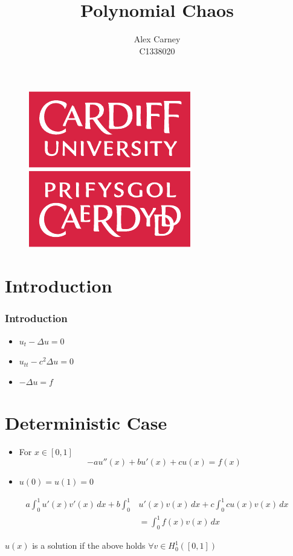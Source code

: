 \documentclass{beamer}
\date{}
\title{Polynomial Chaos}
\author{Alex Carney \\ C1338020}
\begin{document}
\begin{frame}
    \titlepage
    \begin{figure}
        \centering
        \includegraphics[width=0.25\linewidth]{img/universitylogo-eps-converted-to.pdf}
    \end{figure}
\end{frame}

\section{Introduction}

\begin{frame}
    \frametitle{Introduction}

    \pause
    \begin{itemize}
        \item $u_t - \Delta u = 0$
        \pause
        \item $u_{tt} - c^2\Delta u = 0$
        \pause
        \item $-\Delta u = f$
    \end{itemize}
\end{frame}

\section{Deterministic Case}
\begin{frame}
    \begin{itemize}
        \item For $x \in [0,1]$ $$-au''(x) + bu'(x) + cu(x) = f(x)$$
        \item $u(0) = u(1) = 0$
    \end{itemize}
\end{frame}

\begin{frame}
    \begin{align*}
        a\int_0^1u'(x)v'(x)\, dx + b\int_0^1&u'(x)v(x)\, dx + c\int_0^1cu(x)v(x)\, dx \\
                                            &= \int_0^1f(x)v(x)\, dx
    \end{align*}

    $u(x)$ is a solution if the above holds $\forall v \in H_0^1([0,1])$
\end{frame}
\end{document}
